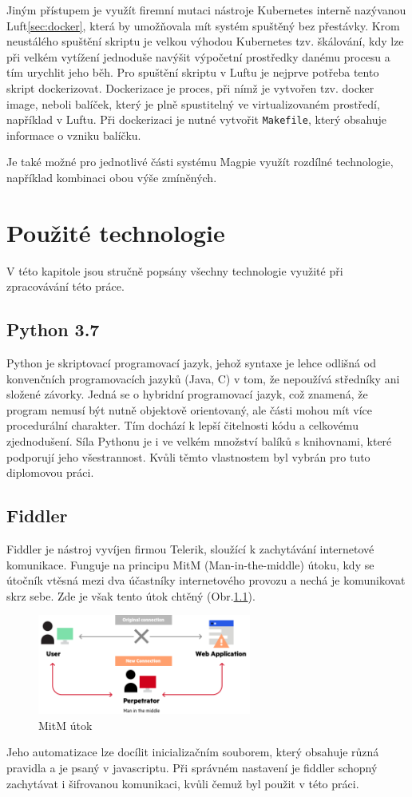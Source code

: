\documentclass[thesis=M,czech,hidelinks]{FITthesis}[2013/05/06]
\begin{document}
Jiným přístupem je využít firemní mutaci nástroje Kubernetes interně nazývanou Luft\ref{sec:docker}, která by umožňovala mít systém spuštěný bez přestávky. Krom neustálého spuštění skriptu je velkou výhodou Kubernetes tzv. škálování, kdy lze při velkém vytížení jednoduše navýšit výpočetní prostředky danému procesu a tím urychlit jeho běh. Pro spuštění skriptu v Luftu je nejprve potřeba tento skript dockerizovat. Dockerizace je proces, při nímž je vytvořen tzv. docker image, neboli balíček, který je plně spustitelný ve virtualizovaném prostředí, například v Luftu. Při dockerizaci je nutné vytvořit \texttt{Makefile}, který obsahuje informace o vzniku balíčku. 

Je také možné pro jednotlivé části systému Magpie využít rozdílné technologie, například kombinaci obou výše zmíněných.






\chapter{Použité technologie}
V této kapitole jsou stručně popsány všechny technologie využité při zpracovávání této práce.
\section{Python 3.7}\label{sec:python}
Python je skriptovací programovací jazyk, jehož syntaxe je lehce odlišná od konvenčních programovacích jazyků (Java, C) v tom, že nepoužívá středníky ani složené závorky. Jedná se o hybridní programovací jazyk, což znamená, že program nemusí být nutně objektově orientovaný, ale části mohou mít více procedurální charakter. Tím dochází k lepší čitelnosti kódu a celkovému zjednodušení. Síla Pythonu je i ve velkém množství balíků s knihovnami, které podporují jeho všestrannost. Kvůli těmto vlastnostem byl vybrán pro tuto diplomovou práci.

\section{Fiddler}\label{sec:fiddler}
Fiddler\cite{fiddler} je nástroj vyvíjen firmou Telerik, sloužící k zachytávání internetové komunikace. Funguje na principu MitM (Man-in-the-middle) útoku, kdy se útočník vtěsná mezi dva účastníky internetového provozu a nechá je komunikovat skrz sebe. Zde je však tento útok chtěný (Obr.\ref{fig:mitm}).
\begin{figure}[h]
	\centering
	\includegraphics[width=7cm]{pictures/mitm.png}
	\caption{MitM útok \cite{mitm}}
	\label{fig:mitm}
\end{figure}
Jeho automatizace lze docílit inicializačním souborem, který obsahuje různá pravidla a je psaný v javascriptu. Při správném nastavení je fiddler schopný zachytávat i šifrovanou komunikaci, kvůli čemuž byl použit v této práci.
\end{document}
